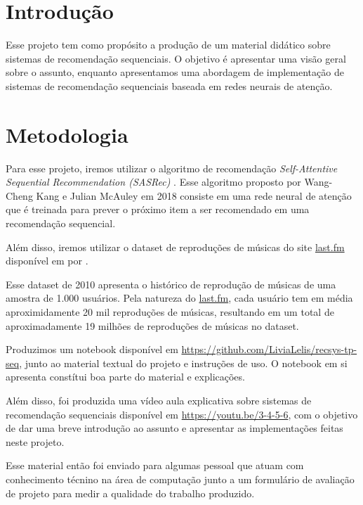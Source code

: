 \nocite{srssbrs} %

\section*{Introdução}

Esse projeto tem como propósito a produção de um material didático
sobre sistemas de recomendação sequenciais. O objetivo é apresentar
uma visão geral sobre o assunto, enquanto apresentamos uma abordagem
de implementação de sistemas de recomendação sequenciais baseada em
redes neurais de atenção.

\section*{Metodologia}

Para esse projeto, iremos utilizar o algoritmo de recomendação
\textit{Self-Attentive Sequential Recommendation (SASRec)} \cite{sasrec}.
Esse algoritmo proposto por Wang-Cheng Kang e Julian McAuley em 2018
consiste em uma rede neural de atenção que é treinada para prever o
próximo item a ser recomendado em uma recomendação sequencial.

Além disso, iremos utilizar o dataset de reproduções de músicas
do site \url{last.fm} disponível em 
\cite{lastfm_dataset} por \citeauthor{lastfm_book} \cite{lastfm_book}.

Esse dataset de 2010 apresenta o histórico de reprodução de músicas
de uma amostra de 1.000 usuários. Pela natureza do \url{last.fm},
cada usuário tem em média aproximidamente 20 mil reproduções de músicas,
resultando em um total de aproximadamente 19 milhões de reproduções
de músicas no dataset.

Produzimos um notebook disponível em \url{https://github.com/LiviaLelis/recsys-tp-seq},
junto ao material textual do projeto e instruções de uso. O notebook em
si apresenta constítui boa parte do material e explicações.

Além disso, foi produzida uma vídeo aula explicativa sobre sistemas de
recomendação sequenciais disponível em \url{https://youtu.be/3-4-5-6},
com o objetivo de dar uma breve introdução ao assunto e apresentar as
implementações feitas neste projeto.

Esse material então foi enviado para algumas pessoal que atuam com 
conhecimento técnino na área de computação junto a um formulário de
avaliação de projeto para medir a qualidade do trabalho produzido.

